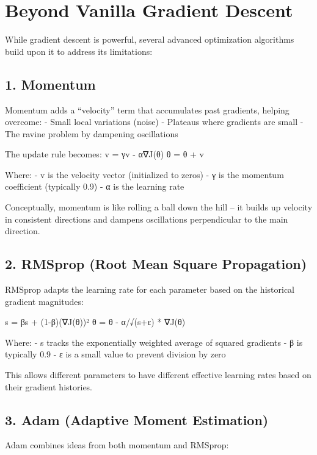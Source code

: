 \documentclass[
  letterpaper,
  DIV=11,
  numbers=noendperiod]{scrreprt}
\begin{document}
\section{Beyond Vanilla Gradient
Descent}\label{beyond-vanilla-gradient-descent}

While gradient descent is powerful, several advanced optimization
algorithms build upon it to address its limitations:

\subsection{1. Momentum}\label{momentum}

Momentum adds a ``velocity'' term that accumulates past gradients,
helping overcome: - Small local variations (noise) - Plateaus where
gradients are small - The ravine problem by dampening oscillations

The update rule becomes: v = γv - α∇J(θ) θ = θ + v

Where: - v is the velocity vector (initialized to zeros) - γ is the
momentum coefficient (typically 0.9) - α is the learning rate

Conceptually, momentum is like rolling a ball down the hill -- it builds
up velocity in consistent directions and dampens oscillations
perpendicular to the main direction.

\subsection{2. RMSprop (Root Mean Square
Propagation)}\label{rmsprop-root-mean-square-propagation}

RMSprop adapts the learning rate for each parameter based on the
historical gradient magnitudes:

s = βs + (1-β)(∇J(θ))² θ = θ - α/√(s+ε) * ∇J(θ)

Where: - s tracks the exponentially weighted average of squared
gradients - β is typically 0.9 - ε is a small value to prevent division
by zero

This allows different parameters to have different effective learning
rates based on their gradient histories.

\subsection{3. Adam (Adaptive Moment
Estimation)}\label{adam-adaptive-moment-estimation}

Adam combines ideas from both momentum and RMSprop:
\end{document}
